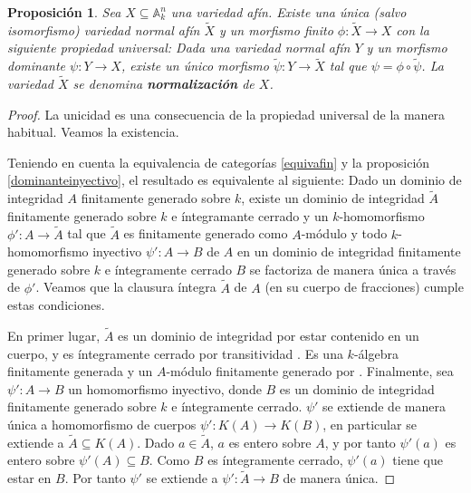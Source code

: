 \documentclass[a4paper,10pt]{book}
\newtheorem{prop}[thm]{Proposición}
\newcommand{\AAA}{\mathbb A}
\newcommand{\Ank}{\AAA^n_k}
\begin{document}
\begin{prop}
 Sea $X\subseteq\Ank$ una variedad afín. Existe una única (salvo isomorfismo) variedad normal afín $\tilde X$ y un morfismo finito $\phi:\tilde X\to X$ con la siguiente propiedad universal: Dada una variedad normal afín $Y$ y un morfismo dominante $\psi:Y\to X$, existe un único morfismo $\tilde\psi:Y\to\tilde X$ tal que $\psi=\phi\circ\tilde\psi$. La variedad $\tilde X$ se denomina {\bf normalización} de $X$.
\end{prop}

\begin{proof} La unicidad es una consecuencia de la propiedad universal de la manera habitual. Veamos la existencia.

 Teniendo en cuenta la equivalencia de categorías \ref{equivafin} y la proposición \ref{dominanteinyectivo}, el resultado es equivalente al siguiente: Dado un dominio de integridad $A$ finitamente generado sobre $k$, existe un dominio de integridad $\tilde A$ finitamente generado sobre $k$ e íntegramante cerrado y un $k$-homomorfismo $\phi':A\to \tilde A$ tal que $\tilde A$ es finitamente generado como $A$-módulo y todo $k$-homomorfismo inyectivo $\psi':A\to B$ de $A$ en un dominio de integridad finitamente generado sobre $k$ e íntegramente cerrado $B$ se factoriza de manera única a través de $\phi'$. Veamos que la clausura íntegra $\tilde A$ de $A$ (en su cuerpo de fracciones) cumple estas condiciones.

En primer lugar, $\tilde A$ es un dominio de integridad por estar contenido en un cuerpo, y es íntegramente cerrado por transitividad \cite[Corolario 5.4]{am}. Es una $k$-álgebra finitamente generada y un $A$-módulo finitamente generado por \cite[Theorem 3.9A]{h}. Finalmente, sea $\psi':A\to B$ un homomorfismo inyectivo, donde $B$ es un dominio de integridad finitamente generado sobre $k$ e íntegramente cerrado. $\psi'$ se extiende de manera única a homomorfismo de cuerpos $\psi':K(A)\to K(B)$, en particular se extiende a $\tilde A\subseteq K(A)$. Dado $a\in\tilde A$, $a$ es entero sobre $A$, y por tanto $\psi'(a)$ es entero sobre $\psi'(A)\subseteq B$. Como $B$ es íntegramente cerrado, $\psi'(a)$ tiene que estar en $B$. Por tanto $\psi'$ se extiende a $\psi':\tilde A\to B$ de manera única.  
\end{proof}
\end{document}
